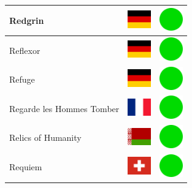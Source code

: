 \documentclass[12pt, a4paper, twoside]{report}
\begin{document}
\begin{center}
\begin{longtable}{|p{5cm}|p{2cm}|p{2cm}|}
 Redgrin                                                    & \includegraphics[width=1cm]{../img/flags/de} &   \includegraphics[width=1cm]{../likes/y} \\ \hline
 Reflexor                                                   & \includegraphics[width=1cm]{../img/flags/de} &   \includegraphics[width=1cm]{../likes/y} \\ \hline
 Refuge                                                     & \includegraphics[width=1cm]{../img/flags/de} &   \includegraphics[width=1cm]{../likes/y} \\ \hline
 Regarde les Hommes Tomber                                  & \includegraphics[width=1cm]{../img/flags/fr} &   \includegraphics[width=1cm]{../likes/y} \\ \hline
 Relics of Humanity                                         & \includegraphics[width=1cm]{../img/flags/by} &   \includegraphics[width=1cm]{../likes/y} \\ \hline
 Requiem                                                    & \includegraphics[width=1cm]{../img/flags/ch} &   \includegraphics[width=1cm]{../likes/y} \\ \hline

\end{longtable}
\end{center}
\end{document}
